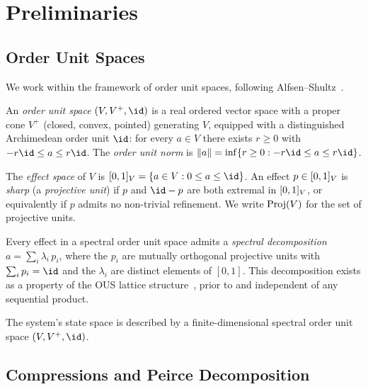 \documentclass[11pt]{article}
\begin{document}
\section{Preliminaries}
\label{sec:prelim}


\subsection{Order Unit Spaces}
\label{sec:ous}

We work within the framework of order unit spaces, following
Alfsen--Shultz~\cite{AlfsenShultz2003}.

\begin{definition}\label{def:ous}
  An \emph{order unit space} $(V, V^{+}, \id)$ is a real ordered
  vector space with a proper cone $V^{+}$ (closed, convex, pointed)
  generating $V$, equipped with a distinguished Archimedean order unit
  $\id$: for every $a \in V$ there exists $r \geq 0$ with
  $-r\id \leq a \leq r\id$.  The \emph{order unit norm} is
  $\|a\| = \inf\{r \geq 0 : -r\id \leq a \leq r\id\}$.
\end{definition}

The \emph{effect space} of $V$ is
$\eff{V} = \{a \in V : 0 \leq a \leq \id\}$.  An effect
$p \in [0,1]_{V}$ is \emph{sharp} (a \emph{projective unit}) if $p$ and
$\id - p$ are both extremal in $[0,1]_{V}$, or equivalently if $p$
admits no non-trivial refinement.  We write $\mathrm{Proj}(V)$ for the set of
projective units.

Every effect in a spectral order unit space admits a \emph{spectral
decomposition} $a = \sum_{i} \lambda_{i}\, p_{i}$, where the $p_{i}$
are mutually orthogonal projective units with
$\sum_{i} p_{i} = \id$ and the $\lambda_{i}$ are distinct elements of
$[0,1]$.  This decomposition exists as a property of the OUS lattice
structure~\cite{AlfsenShultz2003}, prior to and independent of any
sequential product.

\begin{assumption}\label{ass:finite}
  The system's state space is described by a finite-dimensional
  spectral order unit space $(V, V^{+}, \id)$.
\end{assumption}


\subsection{Compressions and Peirce Decomposition}
\label{sec:compressions}
\end{document}
